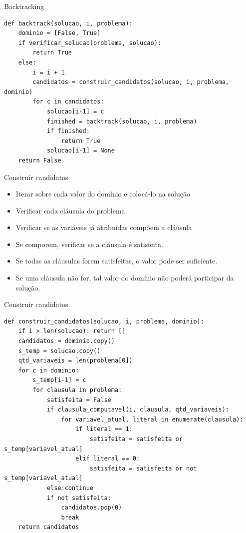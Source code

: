 \documentclass[compress,aspectratio=169]{beamer}
\begin{document}
    \begin{frame}[fragile]{Backtracking}
        \begin{lstlisting}
def backtrack(solucao, i, problema):
    dominio = [False, True]
    if verificar_solucao(problema, solucao):
        return True
    else:
        i = i + 1
        candidatos = construir_candidatos(solucao, i, problema, dominio)
        for c in candidatos:
            solucao[i-1] = c
            finished = backtrack(solucao, i, problema)
            if finished:
                return True
            solucao[i-1] = None
    return False
        \end{lstlisting}
    \end{frame}

    \begin{frame}{Construir candidatos}
        \begin{itemize}
            \item Iterar sobre cada valor do domínio e colocá-lo na solução
            \item Verificar cada cláusula do problema
            \item Verificar se as variáveis já atribuídas compõem a cláusula
            \item Se comporem, verificar se a cláusula é satisfeita. 
            \item Se todas as cláusulas forem satisfeitas, o valor pode ser suficiente.
            \item Se uma cláusula não for, tal valor do domínio não poderá participar da solução.
        \end{itemize}
    \end{frame}

    \begin{frame}[fragile]{Construir candidatos}
        \begin{lstlisting}
def construir_candidatos(solucao, i, problema, dominio):
    if i > len(solucao): return []
    candidatos = dominio.copy()
    s_temp = solucao.copy()
    qtd_variaveis = len(problema[0])
    for c in dominio:
        s_temp[i-1] = c
        for clausula in problema:
            satisfeita = False  
            if clausula_computavel(i, clausula, qtd_variaveis):
                for variavel_atual, literal in enumerate(clausula):
                    if literal == 1:
                        satisfeita = satisfeita or s_temp[variavel_atual]
                    elif literal == 0:
                        satisfeita = satisfeita or not s_temp[variavel_atual]
            else:continue
            if not satisfeita:
                candidatos.pop(0)
                break
    return candidatos
        \end{lstlisting}
    \end{frame}
\end{document}
